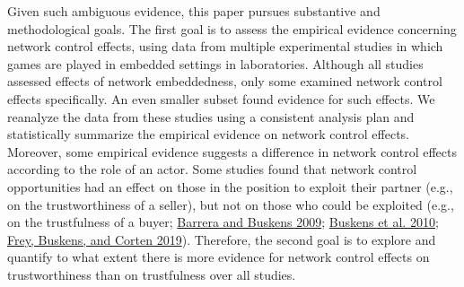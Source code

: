\documentclass[
  11pt,
]{article}
\begin{document}
Given such ambiguous evidence, this paper pursues substantive and methodological goals.
The first goal is to assess the empirical evidence concerning network control effects, using data from multiple experimental studies in which games are played in embedded settings in laboratories.
Although all studies assessed effects of network embeddedness, only some examined network control effects specifically.
An even smaller subset found evidence for such effects.
We reanalyze the data from these studies using a consistent analysis plan and statistically summarize the empirical evidence on network control effects.
Moreover, some empirical evidence suggests a difference in network control effects according to the role of an actor.
Some studies found that network control opportunities had an effect on those in the position to exploit their partner (e.g., on the trustworthiness of a seller), but not on those who could be exploited (e.g., on the trustfulness of a buyer; \protect\hyperlink{ref-barrera_buskens_third_2009}{Barrera and Buskens 2009}; \protect\hyperlink{ref-buskens_raub_veer_triads_2010}{Buskens et al. 2010}; \protect\hyperlink{ref-frey_buskens_investments_2019}{Frey, Buskens, and Corten 2019}).
Therefore, the second goal is to explore and quantify to what extent there is more evidence for network control effects on trustworthiness than on trustfulness over all studies.
\end{document}
